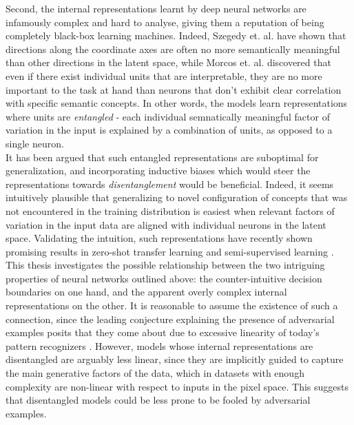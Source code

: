 \documentclass{report}
\begin{document}
  \noindent Second, the internal representations learnt by deep neural networks are infamously complex and hard to analyse, giving them a reputation of being completely black-box learning machines. Indeed, Szegedy et. al. \cite{intriguing-properties} have shown that directions along the coordinate axes are often no more semantically meaningful than other directions in the latent space, while Morcos et. al. \cite{importance-single-directions} discovered that even if there exist individual units that are interpretable, they are no more important to the task at hand than neurons that don't exhibit clear correlation with specific semantic concepts. In other words, the models learn representations where units are \textit{entangled} - each individual semnatically meaningful factor of variation in the input is explained by a combination of units, as opposed to a single neuron. \\
\noindent It has been argued \cite{bengio-representation} that such entangled representations are suboptimal for generalization, and incorporating inductive biases which would steer the representations towards \textit{disentanglement} would be beneficial. Indeed, it seems intuitively plausible that generalizing to novel configuration of concepts that was not encountered in the training distribution is easiest when relevant factors of variation in the input data are aligned with individual neurons in the latent space. Validating the intuition, such representations have recently shown promising results in zero-shot transfer learning \cite{darla} and semi-supervised learning \cite{dgpose}. \\

\noindent This thesis investigates the possible relationship between the two intriguing properties of neural networks outlined above: the counter-intuitive decision boundaries on one hand, and the apparent overly complex internal representations on the other. It is reasonable to assume the existence of such a connection, since the leading conjecture explaining the presence of adversarial examples posits that they come about due to excessive linearity of today's pattern recognizers \cite{explaining-and-harnessing}. However, models whose internal representations are disentangled are arguably less linear, since they are implicitly guided to capture the main generative factors of the data, which in datasets with enough complexity are non-linear with respect to inputs in the pixel space. This suggests that disentangled models could be less prone to be fooled by adversarial examples. \\
\end{document}
